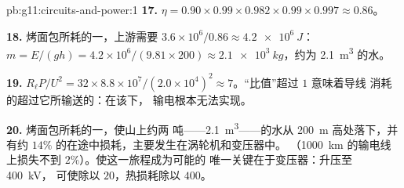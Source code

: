 \begin{solution}{pb:g11:circuits-and-power:1}
\textbf{17.} $\eta = 0.90 \times 0.99 \times 0.982 \times 0.99 \times
0.997 \approx 0.86$。

\textbf{18.} 烤面包所耗的一，上游需要 $3.6\times10^{6}/0.86
\approx \qty{4.2e6}{J}$：$m = E/(gh) = 4.2\times10^{6}/(9.81
\times 200) \approx \qty{2.1e3}{kg}$，约为 \qty{2.1}{m^3} 的水。

\textbf{19.} $R_\ell P/U^2 = 32 \times 8.8\times10^{7}/(2.0\times
10^{4})^2 \approx 7$。“比值”超过 $1$ 意味着导线
消耗的超过它所输送的：在该下，
输电根本无法实现。

\textbf{20.} 烤面包所耗的一，使山上约两
吨——\qty{2.1}{m^3}——的水从 \qty{200}{m} 高处落下，并有约
$14\%$ 的在途中损耗，主要发生在涡轮机和变压器中。
（\qty{1000}{km} 的输电线上损失不到 $2\%$）。使这一旅程成为可能的
唯一关键在于变压器：升压至 \qty{400}{kV}，
可使除以 $20$，热损耗除以 $400$。
\end{solution}
